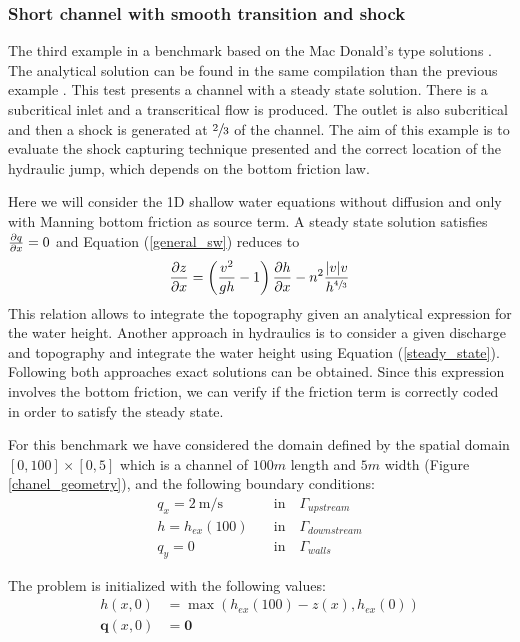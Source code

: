 \subsubsection{Short channel with smooth transition and shock}

The third example in a benchmark based on the Mac Donald's type solutions \cite{macdonald1997}. The analytical solution can be found in the same compilation than the previous example \cite{delestre2013}. This test presents a channel with a steady state solution. There is a subcritical inlet and a transcritical flow is produced. The outlet is also subcritical and then a shock is generated at $\sfrac{2}{3}$ of the channel. The aim of this example is to evaluate the shock capturing technique presented and the correct location of the hydraulic jump, which depends on the bottom friction law.

Here we will consider the 1D shallow water equations without diffusion and only with Manning bottom friction as source term. A steady state solution satisfies $\frac{\partial q}{\partial x}=0$ and Equation (\ref{general_sw}) reduces to
\begin{equation} \label{steady_state}
\frac{\partial z}{\partial x} = \left(\frac{v^2}{gh}-1\right) \frac{\partial h}{\partial x} - n^2\frac{\lvert v\rvert v}{h^{\sfrac{4}{3}}}
\end{equation}
This relation allows to integrate the topography given an analytical expression for the water height. Another approach in hydraulics is to consider a given discharge and topography and integrate the water height using Equation (\ref{steady_state}). Following both approaches exact solutions can be obtained. Since this expression involves the bottom friction, we can verify if the friction term is correctly coded in order to satisfy the steady state.

For this benchmark we have considered the domain defined by the spatial domain $[0,100]\times[0,5]$ which is a channel of $100m$ length and $5m$ width (Figure \ref{chanel_geometry}), and the following boundary conditions:
\begin{equation}
\begin{split}
    q_x = 2\ \text{m/s} \quad &\text{in} \quad \Gamma_{upstream} \\
    h = h_{ex}(100) \quad &\text{in} \quad \Gamma_{downstream} \\
    q_y = 0 \quad &\text{in} \quad \Gamma_{walls}
\end{split}
\end{equation}

The problem is initialized with the following values:
\begin{equation}
\begin{split}
    h(x,0) &= \max(h_{ex}(100) - z(x), h_{ex}(0)) \\
    \mathbf{q}(x,0) &= \mathbf{0}
\end{split}
\end{equation}

